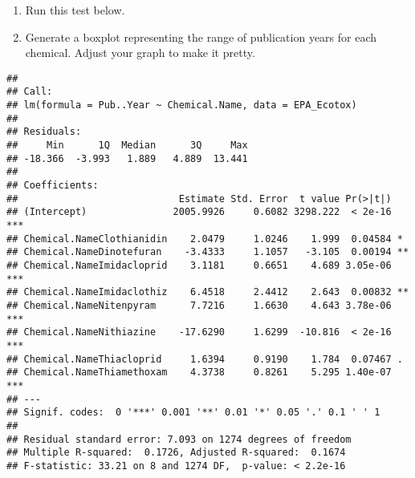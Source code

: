 \documentclass[]{article}
\newenvironment{Shaded}{\begin{snugshade}}{\end{snugshade}}
\newcommand{\KeywordTok}[1]{\textcolor[rgb]{0.13,0.29,0.53}{\textbf{#1}}}
\newcommand{\DataTypeTok}[1]{\textcolor[rgb]{0.13,0.29,0.53}{#1}}
\newcommand{\StringTok}[1]{\textcolor[rgb]{0.31,0.60,0.02}{#1}}
\newcommand{\CommentTok}[1]{\textcolor[rgb]{0.56,0.35,0.01}{\textit{#1}}}
\newcommand{\OperatorTok}[1]{\textcolor[rgb]{0.81,0.36,0.00}{\textbf{#1}}}
\newcommand{\NormalTok}[1]{#1}
\begin{document}
\begin{enumerate}
\def\labelenumi{\arabic{enumi}.}
\setcounter{enumi}{6}
\item
  Run this test below.
\item
  Generate a boxplot representing the range of publication years for
  each chemical. Adjust your graph to make it pretty.
\end{enumerate}

\begin{Shaded}
\end{Shaded}

\begin{verbatim}
## 
## Call:
## lm(formula = Pub..Year ~ Chemical.Name, data = EPA_Ecotox)
## 
## Residuals:
##     Min      1Q  Median      3Q     Max 
## -18.366  -3.993   1.889   4.889  13.441 
## 
## Coefficients:
##                            Estimate Std. Error  t value Pr(>|t|)    
## (Intercept)               2005.9926     0.6082 3298.222  < 2e-16 ***
## Chemical.NameClothianidin    2.0479     1.0246    1.999  0.04584 *  
## Chemical.NameDinotefuran    -3.4333     1.1057   -3.105  0.00194 ** 
## Chemical.NameImidacloprid    3.1181     0.6651    4.689 3.05e-06 ***
## Chemical.NameImidaclothiz    6.4518     2.4412    2.643  0.00832 ** 
## Chemical.NameNitenpyram      7.7216     1.6630    4.643 3.78e-06 ***
## Chemical.NameNithiazine    -17.6290     1.6299  -10.816  < 2e-16 ***
## Chemical.NameThiacloprid     1.6394     0.9190    1.784  0.07467 .  
## Chemical.NameThiamethoxam    4.3738     0.8261    5.295 1.40e-07 ***
## ---
## Signif. codes:  0 '***' 0.001 '**' 0.01 '*' 0.05 '.' 0.1 ' ' 1
## 
## Residual standard error: 7.093 on 1274 degrees of freedom
## Multiple R-squared:  0.1726, Adjusted R-squared:  0.1674 
## F-statistic: 33.21 on 8 and 1274 DF,  p-value: < 2.2e-16
\end{verbatim}

\begin{Shaded}
\end{Shaded}
\end{document}
